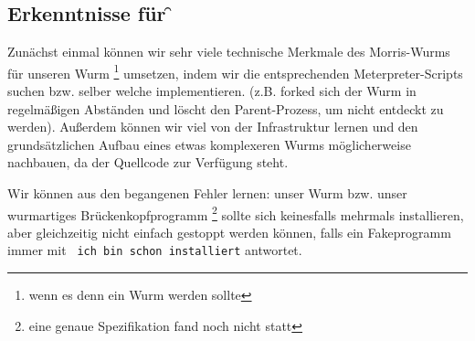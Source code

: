 \subsection {Erkenntnisse für \f}

Zunächst einmal können wir sehr viele technische Merkmale des
Morris-Wurms für unseren Wurm \footnote {wenn es denn ein Wurm werden
sollte} umsetzen, indem wir die entsprechenden Meterpreter-Scripts
suchen bzw. selber welche implementieren. (z.B. forked sich der Wurm
in regelmäßigen Abständen und löscht den Parent-Prozess, um nicht
entdeckt zu werden). Außerdem können wir viel von der Infrastruktur
lernen und den grundsätzlichen Aufbau eines etwas komplexeren Wurms
möglicherweise nachbauen, da der Quellcode zur Verfügung steht.

Wir können aus den begangenen Fehler lernen: unser Wurm bzw. unser
wurmartiges Brückenkopfprogramm \footnote {eine genaue Spezifikation
fand noch nicht statt} sollte sich keinesfalls mehrmals installieren,
aber gleichzeitig nicht einfach gestoppt werden können, falls ein
Fakeprogramm immer mit \texttt{ ich bin schon installiert} antwortet.








